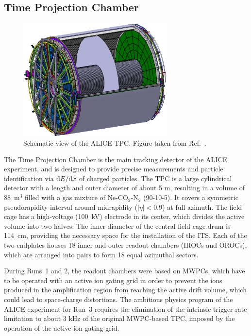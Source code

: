 \subsection{Time Projection Chamber}
\begin{figure}
    \centering
    \includegraphics[width=0.7\textwidth]{Figures/Chapter 3/TPC_Scheme.png}
    \caption{Schematic view of the ALICE TPC. Figure taken from Ref.~\cite{ALICE:2023udb}.}
    \label{fig:TPC}
\end{figure}
The Time Projection Chamber is the main tracking detector of the ALICE experiment, and is designed to provide precise \pt measurements and particle identification via $\mathrm{d} E/\mathrm{d} x$ of charged particles. The TPC is a large cylindrical detector with a length and outer diameter of about 5 m, resulting in a volume of 88~m$^3$ filled with a gas mixture of Ne-CO$_2$-N$_2$ (90-10-5). It covers a symmetric pseudorapidity interval around midrapidity ($\lvert\eta\rvert < 0.9$) at full azimuth. The field cage has a high-voltage (100~kV) electrode in its center, which divides the active volume into two halves. The inner diameter of the central field cage drum is 114~cm, providing the necessary space for the installation of the ITS.  Each of the two endplates houses 18 inner and outer readout chambers (IROCs and OROCs), which are arranged into pairs to form 18 equal azimuthal sectors.

During Runs~1 and 2, the readout chambers were based on MWPCs, which have to be operated with an active ion gating grid in order to prevent the ions produced in the amplification region from reaching the active drift volume, which could lead to space-charge distortions. The ambitious physics program of the ALICE experiment for Run~3 requires the elimination of the intrinsic trigger rate limitation to about 3 kHz of the original MWPC-based TPC, imposed by the operation of the active ion gating grid.

